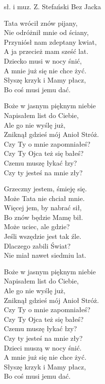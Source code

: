 {sł. i muz. Z. Stefański}
{Bez Jacka}
\begin{text}
Tata wrócił znów pijany,\\
Nie odróżnił mnie od ściany,\\
Przyniósł nam zdeptany kwiat,\\
A ja przecież mam sześć lat.\\
Dziecko musi w nocy śnić,\\
A mnie już się nie chce żyć.\\
Słyszę krzyk i Mamy płacz,\\
Bo coś musi jemu dać.

\vin Boże w jasnym pięknym niebie\\
\vin Napisałem list do Ciebie,\\
\vin Ale go nie wyślę już,\\
\vin Zniknął gdzieś mój Anioł Stróż.\\
\vin Czy Ty o mnie zapomniałeś?\\
\vin Czy Ty Ojca też się bałeś?\\
\vin Czemu muszę łykać łzy?\\
\vin Czy ty jesteś na mnie zły?

Grzeczny jestem, śmieję się.\\
Może Tata nie chciał mnie.\\
Więcej jem, by nabrać sił,\\
Bo znów będzie Mamę bił.\\
Może uciec, ale gdzie?\\
Jeśli wszędzie jest tak źle.\\
Dlaczego zabili Świat?\\
Nie miał nawet siedmiu lat.

\vin Boże w jasnym pięknym niebie\\
\vin Napisałem list do Ciebie,\\
\vin Ale go nie wyślę już,\\
\vin Zniknął gdzieś mój Anioł Stróż.\\
\vin Czy Ty o mnie zapomniałeś?\\
\vin Czy Ty Ojca też się bałeś?\\
\vin Czemu muszę łykać łzy?\\
\vin Czy ty jesteś na mnie zły?\\
\vin Dzieci muszą w nocy śnić.\\
\vin A mnie już się nie chce żyć.\\
\vin Słyszę krzyk i Mamy płacz,\\
\vin Bo coś musi jemu dać.
\end{text}
\begin{chord}
\end{chord}